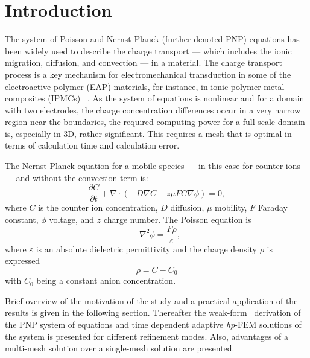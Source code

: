 \section{Introduction}
The system of Poisson and Nernst-Planck (further denoted PNP) 
equations has been widely
used to describe the charge transport --- which includes the ionic
migration, diffusion, and convection --- in a material. 
The charge transport process is a key mechanism
for electromechanical transduction in some of the electroactive polymer
(EAP) materials, for instance, in ionic polymer-metal composites (IPMCs)~
\cite{basu1997membrane,shahinpoor2001smartmat,
nasser2002applied,newbury2003intelligent, wallmersperger2007appliedphysics,
pugal2008appliedphysics,pugal2010polymer}.
As the system of equations is nonlinear and for a domain with two
electrodes, the charge concentration differences occur in a very narrow
region near the boundaries, the required computing power for a full
scale domain is, especially in 3D, rather significant. This
requires a mesh that is optimal in terms of calculation time and calculation
error.

The Nernst-Planck equation for a mobile species ---
in this case for counter ions --- and without the convection term is:
\begin{equation}
  \frac{\partial C}{\partial t}+\nabla\cdot(-D\nabla C-z\mu FC\nabla\phi)=0,
  \label{eq:nernst-planck}
\end{equation}
where $C$ is the counter ion concentration, $D$ diffusion, $\mu$ mobility,
$F$ Faraday constant, $\phi$ voltage, and $z$ charge number. The Poisson
equation is
\begin{equation}
  -\nabla^2\phi=\frac{F\rho}{\varepsilon},
  \label{eq:poisson}
\end{equation}
where $\varepsilon$ is an absolute dielectric permittivity and the
charge density $\rho$ is expressed
\begin{equation}
  \rho=C-C_{0}
  \label{eq:rho}
\end{equation}
with $C_{0}$ being a constant anion concentration.

Brief overview of the motivation
of the study and a practical application of the results is given in the following section. 
Thereafter the weak-form~\cite{Hermes-book} derivation of the PNP system of equations
and time dependent adaptive \emph{hp}-FEM solutions of the system is presented
for different refinement modes. 
Also, advantages of a multi-mesh solution over a single-mesh solution are presented.

